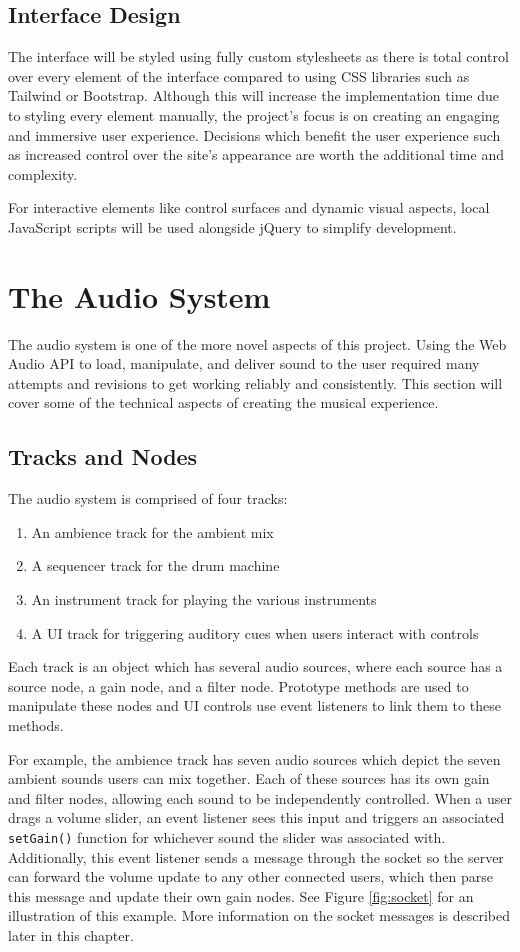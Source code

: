 \subsection{Interface Design}
The interface will be styled using fully custom stylesheets as there is total control over every element of the interface compared to using CSS libraries such as Tailwind or Bootstrap. Although this will increase the implementation time due to styling every element manually, the project’s focus is on creating an engaging and immersive user experience. Decisions which benefit the user experience such as increased control over the site’s appearance are worth the additional time and complexity.

For interactive elements like control surfaces and dynamic visual aspects, local JavaScript scripts will be used alongside jQuery to simplify development.


\section{The Audio System}
The audio system is one of the more novel aspects of this project. Using the Web Audio API to load, manipulate, and deliver sound to the user required many attempts and revisions to get working reliably and consistently. This section will cover some of the technical aspects of creating the musical experience.

\subsection{Tracks and Nodes}
The audio system is comprised of four tracks:
\begin{enumerate}
    \item An ambience track for the ambient mix
    \item A sequencer track for the drum machine
    \item An instrument track for playing the various instruments
    \item A UI track for triggering auditory cues when users interact with controls
\end{enumerate}

Each track is an object which has several audio sources, where each source has a source node, a gain node, and a filter node. Prototype methods are used to manipulate these nodes and UI controls use event listeners to link them to these methods.

For example, the ambience track has seven audio sources which depict the seven ambient sounds users can mix together. Each of these sources has its own gain and filter nodes, allowing each sound to be independently controlled. When a user drags a volume slider, an event listener sees this input and triggers an associated \verb|setGain()| function for whichever sound the slider was associated with. Additionally, this event listener sends a message through the socket so the server can forward the volume update to any other connected users, which then parse this message and update their own gain nodes. See Figure \ref{fig:socket} for an illustration of this example. More information on the socket messages is described later in this chapter.

